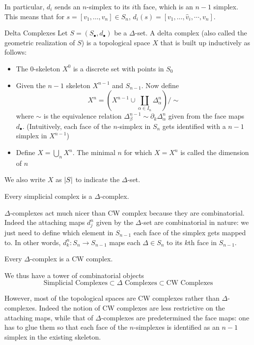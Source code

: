 \documentclass[a4paper]{article}
\begin{document}
In particular, $d_i$ sends an $n$-simplex to its $i$th face, which is an $n-1$ simplex. This means that for $s=[v_1,\dots,v_n]\in S_n$, $d_i(s)=[v_1,\dots,\hat{v}_i,\cdots,v_n]$. 

\begin{defn}{Delta Complexes}{} Let $S=(S_\bullet,d_\bullet)$ be a $\Delta$-set. A delta complex (also called the geometric realization of $S$) is a topological space $X$ that is built up inductively as follows: 
\begin{itemize}
\item The $0$-skeleton $X^0$ is a discrete set with points in $S_0$
\item Given the $n-1$ skeleton $X^{n-1}$ and $S_{n-1}$. Now define $$X^n=\left(X^{n-1}\cup\coprod_{\alpha\in I_n}\Delta_\alpha^n\right)/\sim$$ where $\sim$ is the equivalence relation $\Delta_\beta^{n-1}\sim\partial_k\Delta_\alpha^n$ given from the face maps $d_\bullet$. (Intuitively, each face of the $n$-simplex in $S_n$ gets identified with a $n-1$ simplex in $X^{n-1}$)
\item Define $X=\bigcup_nX^n$. The minimal $n$ for which $X=X^n$ is called the dimension of $n$
\end{itemize}
We also write $X$ as $\abs{S}$ to indicate the $\Delta$-set. 
\end{defn}

\begin{thm}{}{} Every simplicial complex is a $\Delta$-complex. 
\end{thm}

$\Delta$-complexes act much nicer than CW complex because they are combinatorial. Indeed the attaching maps $d_j^n$ given by the $\Delta$-set are combinatorial in nature: we just need to define which element in $S_{n-1}$ each face of the simplex gets mapped to. In other words, $d_k^n:S_n\to S_{n-1}$ maps each $\Delta\in S_n$ to its $k$th face in $S_{n-1}$. 

\begin{thm}{}{} Every $\Delta$-complex is a CW complex. 
\end{thm}

We thus have a tower of combinatorial objects $$\text{Simplicial Complexes}\subset\Delta\text{ Complexes}\subset\text{CW Complexes}$$

However, most of the topological spaces are CW complexes rather than $\Delta$-complexes. Indeed the notion of CW complexes are less restrictive on the attaching maps, while that of $\Delta$-complexes are predetermined the face maps: one has to glue them so that each face of the $n$-simplexes is identified as an $n-1$ simplex in the existing skeleton. 
\end{document}
